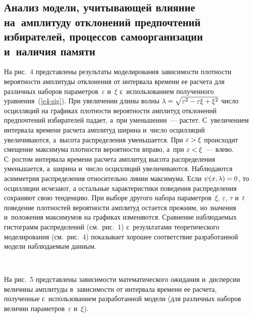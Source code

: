 \begin{multicols}{2}
\subsection{Анализ модели, учитывающей влияние на~амплитуду отклонений 
предпочтений избирателей, процессов самоорганизации и~наличия памяти}
 
    На рис.~4 представлены результаты моделирования зависимости 
плотности вероятности амплитуды отклонения от интервала времени ее расчета 
для различных наборов параметров~$\varepsilon$ и~$\xi$ с~использованием 
полученного уравнения~(\ref{e4-sig}). При увеличении длины волны 
$\lambda\hm= \sqrt{\varepsilon^2-\varepsilon\xi +\xi^2}$ число осцилляций на 
графиках плотности вероятности амплитуд отклонений предпочтений 
избирателей падает, а~при уменьшении~--- растет. С~увеличением интервала 
времени расчета амплитуд ширина и~число осцилляций увеличиваются, 
а~высота распределения уменьшается. При $\varepsilon\hm>\xi$ происходит 
смещение максимума плотности вероятности вправо, а~при 
$\varepsilon\hm<\xi$~--- влево. С~ростом интервала времени расчета амплитуд 
высота распределения уменьшается, а~ширина и~число осцилляций 
увеличиваются. Наблюдаются асимметрия распределения относительно линии 
максимума. Если $\psi(x,\lambda)\hm=0$, то осцилляции исчезают, а остальные 
характеристики поведения распределения сохраняют свою тенденцию. При 
выборе другого набора параметров~$\xi$, $\varepsilon$, $\tau$ и~$t$ поведение 
плотностей вероятности амплитуд остается прежним, но значения и~положения 
максимумов на графиках изменяются. Сравнение наблюдаемых гистограмм 
распределений (см.\ рис.~1) с~результатами теоретического моделирования (см.\ рис.~4) 
показывает хорошее соответствие разработанной модели наблюдаемым 
данным. 

\begin{figure*} %
\vspace*{1pt}
\begin{center}
 \mbox{%
 \epsfxsize=163mm 
 }
 \end{center}
\vspace*{-9pt}
\end{figure*}


На рис.~5 представлены зависимости математического ожидания 
и~дисперсии величины амплитуды в~зависимости от интервала времени ее 
расчета, полученные с~использованием разработанной модели (для различных 
наборов величин параметров~$\varepsilon$ и~$\xi$).
    

\end{multicols}
